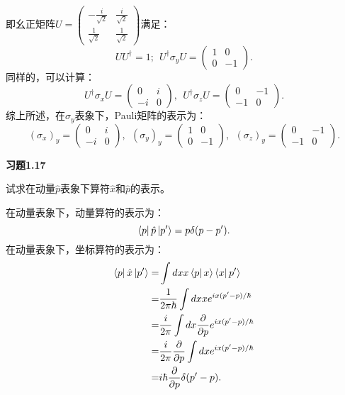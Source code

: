 \documentclass[reqno,a4paper,12pt]{amsart}
\begin{document}
\begin{tcolorbox}[breakable, colback = black!5!white, colframe = black]
即幺正矩阵$U = \left(\begin{matrix}
	-\frac{i}{\sqrt{2}} & \frac{i}{\sqrt{2}} \\
	\frac{1}{\sqrt{2}} & \frac{1}{\sqrt{2}}
\end{matrix}\right)$满足：
\[
	UU^\dagger = 1; ~~ U^\dagger\sigma_y U = \left(\begin{matrix}
		1 & 0 \\
		0 & -1
	\end{matrix}\right).
\]
同样的，可以计算：
\[
	U^\dagger \sigma_x U = \left( \begin{matrix}
		0 & i \\
		-i & 0
	\end{matrix}\right), ~~
	U^\dagger \sigma_z U = \left( \begin{matrix}
		0 & -1 \\
		-1 & 0
	\end{matrix}\right).
\]
综上所述，在$\hat{\sigma}_y$表象下，Pauli矩阵的表示为：
\[
	(\sigma_x)_y = \left( \begin{matrix}
		0 & i \\
		-i & 0
	\end{matrix}\right), ~~
	(\sigma_y)_y = \left( \begin{matrix}
		1 & 0 \\
		0 & -1
	\end{matrix}\right), ~~
	(\sigma_z)_y = \left( \begin{matrix}
		0 & -1 \\
		-1 & 0
	\end{matrix}\right).
\]
\end{tcolorbox}

\textbf{习题1.17}

试求在动量$\hat{p}$表象下算符$\hat{x}$和$\hat{p}$的表示。
\begin{tcolorbox}[breakable, colback = black!5!white, colframe = black]
在动量表象下，动量算符的表示为：
\[
	\bra{p} \hat{p} \ket{p'} = p\delta(p-p').
\]
在动量表象下，坐标算符的表示为：
\begin{align*}
	\bra{p} \hat{x} \ket{p'} =& \int dx x\bra{p} x \rangle \bra{x} p' \rangle \\
	=& \frac{1}{2\pi\hbar} \int dx x e^{ix(p'-p)/\hbar} \\
	=& \frac{i}{2\pi} \int dx \frac{\partial}{\partial p} e^{ix(p'-p)/\hbar} \\
	=& \frac{i}{2\pi} \frac{\partial}{\partial p} \int dx e^{ix(p'-p)/\hbar} \\
	=& i\hbar \frac{\partial}{\partial p} \delta(p'-p).
\end{align*}
\end{tcolorbox}
\end{document}
